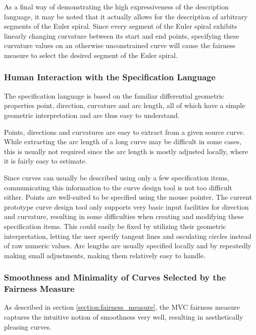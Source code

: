 \documentclass[a4paper]{article}
\begin{document}
				As a final way of demonstrating the high expressiveness of the description language, it may be noted that it actually allows for the description of arbitrary segments of the Euler spiral. Since every segment of the Euler spiral exhibits linearly changing curvature between its start and end points, specifying these curvature values on an otherwise unconstrained curve will cause the fairness measure to select the desired segment of the Euler spiral.

			\subsubsection{Human Interaction with the Specification Language}
			\label{section:human_interaction_specification_language}

				The specification language is based on the familiar differential geometric properties point, direction, curvature and arc length, all of which have a simple geometric interpretation and are thus easy to understand.

				Points, directions and curvatures are easy to extract from a given source curve. While extracting the arc length of a long curve may be difficult in some cases, this is usually not required since the arc length is mostly adjusted locally, where it is fairly easy to estimate.

				Since curves can usually be described using only a few specification items, communicating this information to the curve design tool is not too difficult either. Points are well-suited to be specified using the mouse pointer. The current prototype curve design tool only supports very basic input facilities for direction and curvature, resulting in some difficulties when creating and modifying these specification items. This could easily be fixed by utilizing their geometric interpretation, letting the user specify tangent lines and osculating circles instead of raw numeric values. Arc lengths are usually specified locally and by repeatedly making small adjustments, making them relatively easy to handle.

			\subsubsection{Smoothness and Minimality of Curves Selected by the Fairness Measure}
			\label{section:smoothness_minimality_curves_selected_fairness_measure}

				As described in section \ref{section:fairness_measure}, the MVC fairness measure captures the intuitive notion of smoothness very well, resulting in aesthetically pleasing curves.
\end{document}
